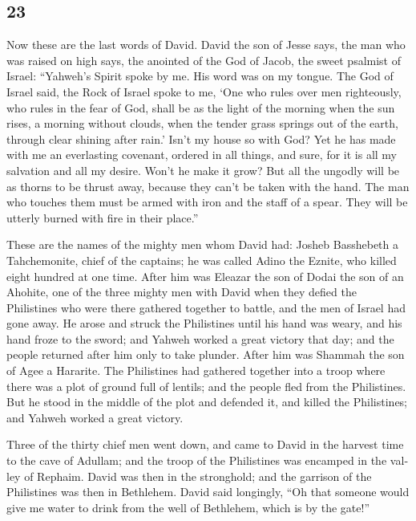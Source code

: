 \begin{paracol}{2}
\switchcolumn
\begin{otherlanguage}{english}

\hypertarget{section-45}{%
\section{23}\label{section-45}}

 Now these are the last words of David. David the son of
Jesse says, the man who was raised on high says, the anointed of the God
of Jacob, the sweet psalmist of Israel:  ``Yahweh's Spirit
spoke by me. His word was on my tongue.  The God of Israel
said, the Rock of Israel spoke to me, `One who rules over men
righteously, who rules in the fear of God,  shall be as
the light of the morning when the sun rises, a morning without clouds,
when the tender grass springs out of the earth, through clear shining
after rain.'  Isn't my house so with God? Yet he has made
with me an everlasting covenant, ordered in all things, and sure, for it
is all my salvation and all my desire. Won't he make it grow?
 But all the ungodly will be as thorns to be thrust away,
because they can't be taken with the hand.  The man who
touches them must be armed with iron and the staff of a spear. They will
be utterly burned with fire in their place.''

 These are the names of the mighty men whom David had:
Josheb Basshebeth a Tahchemonite, chief of the captains; he was called
Adino the Eznite, who killed eight hundred at one time. 
After him was Eleazar the son of Dodai the son of an Ahohite, one of the
three mighty men with David when they defied the Philistines who were
there gathered together to battle, and the men of Israel had gone away.
 He arose and struck the Philistines until his hand was
weary, and his hand froze to the sword; and Yahweh worked a great
victory that day; and the people returned after him only to take
plunder.  After him was Shammah the son of Agee a
Hararite. The Philistines had gathered together into a troop where there
was a plot of ground full of lentils; and the people fled from the
Philistines.  But he stood in the middle of the plot and
defended it, and killed the Philistines; and Yahweh worked a great
victory.

 Three of the thirty chief men went down, and came to
David in the harvest time to the cave of Adullam; and the troop of the
Philistines was encamped in the valley of Rephaim.  David
was then in the stronghold; and the garrison of the Philistines was then
in Bethlehem.  David said longingly, ``Oh that someone
would give me water to drink from the well of Bethlehem, which is by the
gate!''


\end{otherlanguage}
\end{paracol}
